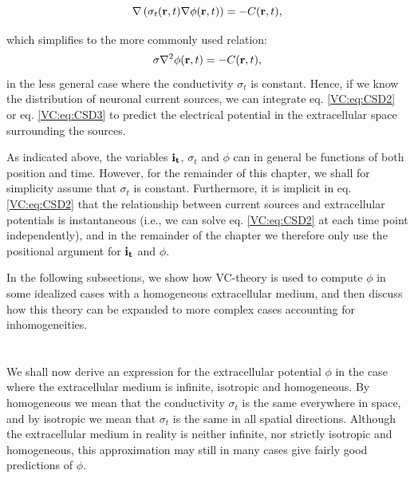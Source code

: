 \begin{equation}
\nabla \left( \sigma_t({\bf r}, t) \nabla \phi({\bf r}, t) \right) = - C({\bf r}, t),
\label{VC:eq:CSD2}
\end{equation}

which simplifies to the more commonly used relation:
\begin{equation}
\sigma \nabla^2\phi({\bf r}, t) = - C({\bf r}, t),
\label{VC:eq:CSD3}
\end{equation}
in the less general case where the conductivity $\sigma_t$ is constant. Hence, if we know the distribution of neuronal current sources, we can integrate eq. \ref{VC:eq:CSD2} or eq. \ref{VC:eq:CSD3} to predict the electrical potential in the extracellular space surrounding the sources. 

As indicated above, the variables ${\bf i_t}$, $\sigma_t$ and $\phi$ can in general be functions of both position and time. However, for the remainder of this chapter, we shall for simplicity assume that $\sigma_t$ is constant. Furthermore, it is implicit in eq. \ref{VC:eq:CSD2} that the relationship between current sources and extracellular potentials is instantaneous (i.e., we can solve eq.  \ref{VC:eq:CSD2} at each time point independently), and in the remainder of the chapter we therefore only use the positional argument for ${\bf i_t}$ and $\phi$. 

In the following subsections, we show how VC-theory is used to compute $\phi$ in some idealized cases with a homogeneous extracellular medium, and then discuss how this theory can be expanded to more complex cases accounting for inhomogeneities. 


\section{}
\label{sec:VC:isohomo}

We shall now derive an expression for the extracellular potential $\phi$ in the case where the extracellular medium is infinite, isotropic and homogeneous. By homogeneous we mean that the conductivity $\sigma_t$ is the same everywhere in space, and by isotropic we mean that $\sigma_t$ is the same in all spatial directions. Although the extracellular medium in reality is neither infinite, nor strictly isotropic and homogeneous, this approximation may still in many cases give fairly good predictions of $\phi$.


